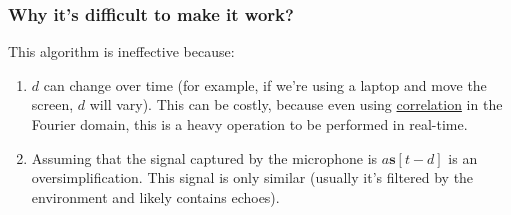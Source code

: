 \subsubsection*{Why it's difficult to make it work?}
This algorithm is ineffective because:
\begin{enumerate}
\item $d$ can change over time (for example, if we're using a laptop
  and move the screen, $d$ will vary). This can be costly, because
  even using \href{https://en.wikipedia.org/wiki/Correlation}{correlation}
  in the Fourier domain, this is a heavy operation to be performed in
  real-time.
\item Assuming that the signal captured by the microphone is
  $a{\mathbf s}[t-d]$ is an oversimplification. This signal is only
  similar (usually it's filtered by the environment and likely
  contains echoes).
\end{enumerate}
